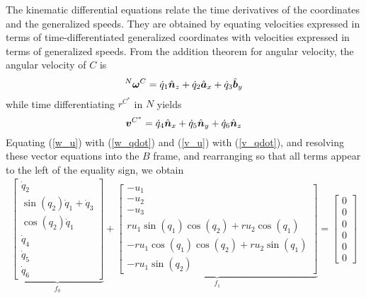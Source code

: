 The kinematic differential equations relate the time derivatives of the
coordinates and the generalized speeds. They are obtained by equating
velocities expressed in terms of time-differentiated generalized coordinates
with velocities expressed in terms of generalized speeds. From the addition
theorem for angular velocity, the angular velocity of $C$ is
\begin{equation}
  \label{w_qdot}
  {^N}\boldsymbol{\omega}^C = \dot{q}_1 \hat{\boldsymbol{n}}_{z} + \dot{q}_2 \hat{\boldsymbol{a}}_{x} + \dot{q}_3 \hat{\boldsymbol{b}}_{y}
\end{equation}
while time differentiating $r^{C^*}$ in $N$ yields
\begin{equation}
  \label{v_qdot}
  \boldsymbol{v}^{C^*} = \dot{q}_4 \hat{\boldsymbol{n}}_{x} + \dot{q}_5 \hat{\boldsymbol{n}}_{y} + \dot{q}_6 \hat{\boldsymbol{n}}_{z}
\end{equation}
Equating (\ref{w_u}) with (\ref{w_qdot}) and (\ref{v_u}) with (\ref{v_qdot}),
and resolving these vector equations into the $B$ frame, and rearranging so
that all terms appear to the left of the equality sign, we obtain
\begin{align}
    \label{rd:f_0_f_1}
\underbrace{\left[\begin{matrix}\dot{q}_{2}\\\sin\left(q_{2}\right)
    \dot{q}_{1} + \dot{q}_{3}\\\cos\left(q_{2}\right)
    \dot{q}_{1}\\\dot{q}_{4}\\\dot{q}_{5}\\\dot{q}_{6}\end{matrix}\right]}_{f_0}
    + 
\underbrace{\left[\begin{matrix}- u_{1}\\- u_{2}\\- u_{3}\\r u_{1}
    \sin\left(q_{1}\right) \cos\left(q_{2}\right) +
    r u_{2} \cos\left(q_{1}\right)\\- r u_{1}
    \cos\left(q_{1}\right) \cos\left(q_{2}\right) +
    r u_{2} \sin\left(q_{1}\right)\\- r u_{1}
    \sin\left(q_{2}\right)\end{matrix}\right]}_{f_1}
    = \left[\begin{matrix} 0\\ 0\\ 0\\ 0\\ 0\\ 0\end{matrix}\right]
\end{align}
